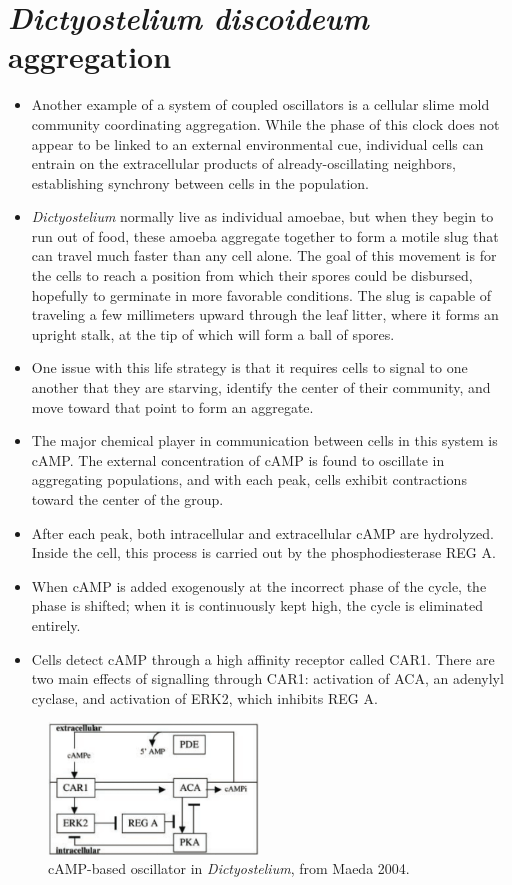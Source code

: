 \documentclass{article}
\begin{document}
\section*{\textit{Dictyostelium discoideum} aggregation}

\begin{itemize}

\item Another example of a system of coupled oscillators is a cellular slime mold community coordinating aggregation. While the phase of this clock does not appear to be linked to an external environmental cue, individual cells can entrain on the extracellular products of already-oscillating neighbors, establishing synchrony between cells in the population.
\item \textit{Dictyostelium} normally live as individual amoebae, but when they begin to run out of food, these amoeba aggregate together to form a motile slug that can travel much faster than any cell alone. The goal of this movement is for the cells to reach a position from which their spores could be disbursed, hopefully to germinate in more favorable conditions. The slug is capable of traveling a few millimeters upward through the leaf litter, where it forms an upright stalk, at the tip of which will form a ball of spores.
\item One issue with this life strategy is that it requires cells to signal to one another that they are starving, identify the center of their community, and move toward that point to form an aggregate. 
\item The major chemical player in communication between cells in this system is cAMP. The external concentration of cAMP is found to oscillate in aggregating populations, and with each peak, cells exhibit contractions toward the center of the group.
\item After each peak, both intracellular and extracellular cAMP are hydrolyzed. Inside the cell, this process is carried out by the phosphodiesterase REG A.
\item When cAMP is added exogenously at the incorrect phase of the cycle, the phase is shifted; when it is continuously kept high, the cycle is eliminated entirely.
\item Cells detect cAMP through a high affinity receptor called CAR1. There are two main effects of signalling through CAR1: activation of ACA, an adenylyl cyclase, and activation of ERK2, which inhibits REG A.
\end{itemize}
\begin{figure}
\begin{center}
\includegraphics[width=0.5\textwidth]{maeda.png}
\caption{cAMP-based oscillator in \textit{Dictyostelium}, from Maeda 2004.}
\end{center}
\end{figure}
\end{document}
